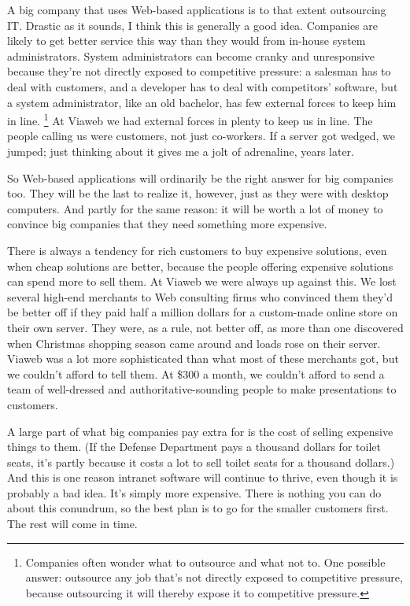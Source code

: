 A big company that uses Web-based applications is to that extent
outsourcing IT. Drastic as it sounds, I think this is generally a good
idea. Companies are likely to get better service this way than they
would from in-house system administrators. System administrators can
become cranky and unresponsive because they're not directly exposed to
competitive pressure: a salesman has to deal with customers, and a
developer has to deal with competitors' software, but a system
administrator, like an old bachelor, has few external forces to keep him
in line. \footnote{Companies often wonder what to outsource and what not to. One
possible answer: outsource any job that's not directly exposed to
competitive pressure, because outsourcing it will thereby expose it to
competitive pressure.} At Viaweb we had external forces in plenty to keep us
in line. The people calling us were customers, not just co-workers. If a
server got wedged, we jumped; just thinking about it gives me a jolt of
adrenaline, years later.

So Web-based applications will ordinarily be the right answer for big
companies too. They will be the last to realize it, however, just as
they were with desktop computers. And partly for the same reason: it
will be worth a lot of money to convince big companies that they need
something more expensive.

There is always a tendency for rich customers to buy expensive
solutions, even when cheap solutions are better, because the people
offering expensive solutions can spend more to sell them. At Viaweb we
were always up against this. We lost several high-end merchants to Web
consulting firms who convinced them they'd be better off if they paid
half a million dollars for a custom-made online store on their own
server. They were, as a rule, not better off, as more than one
discovered when Christmas shopping season came around and loads rose on
their server. Viaweb was a lot more sophisticated than what most of
these merchants got, but we couldn't afford to tell them. At \$300 a
month, we couldn't afford to send a team of well-dressed and
authoritative-sounding people to make presentations to customers.

A large part of what big companies pay extra for is the cost of selling
expensive things to them. (If the Defense Department pays a thousand
dollars for toilet seats, it's partly because it costs a lot to sell
toilet seats for a thousand dollars.) And this is one reason intranet
software will continue to thrive, even though it is probably a bad idea.
It's simply more expensive. There is nothing you can do about this
conundrum, so the best plan is to go for the smaller customers first.
The rest will come in time.

